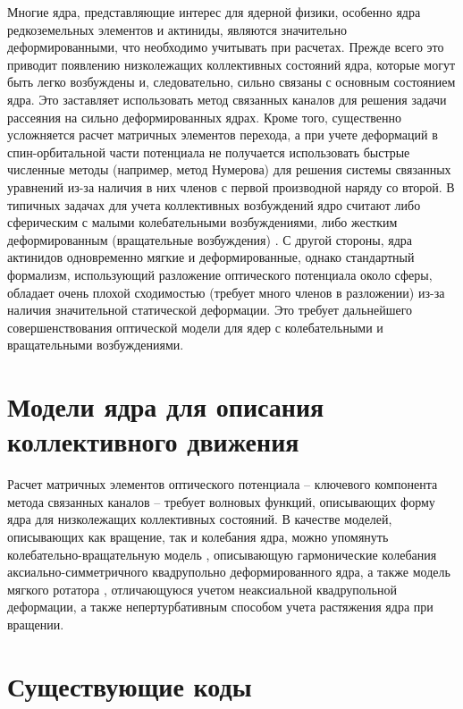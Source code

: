 Многие ядра, представляющие интерес для ядерной физики, особенно ядра редкоземельных элементов и актиниды, являются значительно деформированными, что необходимо учитывать при расчетах. Прежде всего это приводит появлению низколежащих коллективных состояний ядра, которые могут быть легко возбуждены и, следовательно, сильно связаны с основным состоянием ядра. Это заставляет использовать метод связанных каналов для решения задачи рассеяния на сильно деформированных ядрах. Кроме того, существенно усложняется расчет матричных элементов перехода, а при учете деформаций в спин-орбитальной части потенциала не получается использовать быстрые численные методы (например, метод Нумерова) для решения системы связанных уравнений из-за наличия в них членов с первой производной наряду со второй. 
В типичных задачах для учета коллективных возбуждений ядро считают либо сферическим с малыми колебательными возбуждениями, либо жестким деформированным (вращательные возбуждения) \cite{Tamura1965}. С другой стороны, ядра актинидов одновременно мягкие и деформированные, однако стандартный формализм, использующий разложение оптического потенциала около сферы, обладает очень плохой сходимостью (требует много членов в разложении) из-за наличия значительной статической деформации. Это требует дальнейшего совершенствования оптической модели для ядер с колебательными и вращательными возбуждениями.

\section{Модели ядра для описания коллективного движения}

Расчет матричных элементов оптического потенциала – ключевого компонента метода связанных каналов – требует волновых функций, описывающих форму ядра для низколежащих коллективных состояний. В качестве моделей, описывающих как вращение, так и колебания ядра, можно упомянуть колебательно-вращательную модель \cite{EisenbergBookRus}, описывающую гармонические колебания аксиально-симметричного квадрупольно деформированного ядра, а также модель мягкого ротатора \cite{Porodzinskii1991}, отличающуюся учетом неаксиальной квадрупольной деформации, а также непертурбативным способом учета растяжения ядра при вращении.

\section{Существующие коды}

